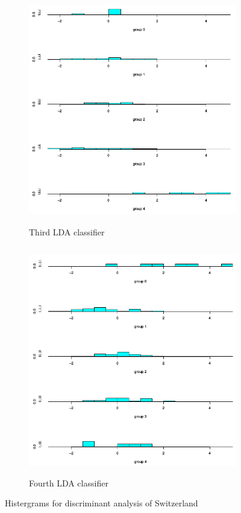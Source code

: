 \documentclass[a4paper]{article}
\begin{document}
\begin{figure}[H]
	\begin{subfigure}{0.5\textwidth}
		\caption{Third LDA classifier}
		\includegraphics[width=0.9\linewidth, height=10cm]{Q4_pics/Swit-Hist3.png}
	\end{subfigure}
	\begin{subfigure}{0.5\textwidth}
		\caption{Fourth LDA classifier}
		\includegraphics[width=0.9\linewidth, height=10cm]{Q4_pics/Swit-Hist4.png}
	\end{subfigure}
	\caption{Histergrams for discriminant analysis of Switzerland}
	\label{q4_swit_historgrams}
\end{figure}

\newpage
\end{document}
